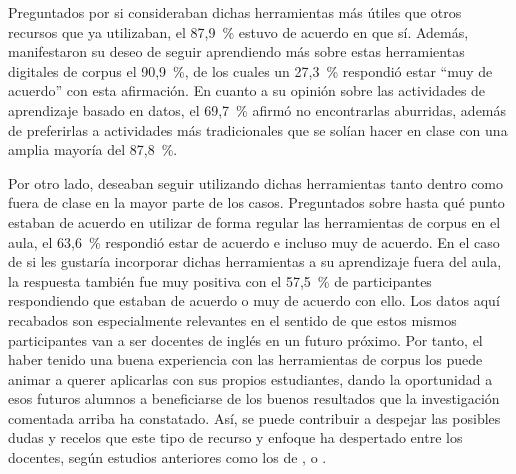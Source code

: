 Preguntados por si consideraban dichas herramientas más útiles que otros
recursos que ya utilizaban, el 87,9~\% estuvo de acuerdo en que sí.
Además, manifestaron su deseo de seguir aprendiendo más sobre estas
herramientas digitales de corpus el 90,9~\%, de los cuales un 27,3~\%
respondió estar ``muy de acuerdo'' con esta afirmación. En cuanto a su
opinión sobre las actividades de aprendizaje basado en datos, el 69,7~\%
afirmó no encontrarlas aburridas, además de preferirlas a actividades
más tradicionales que se solían hacer en clase con una amplia mayoría
del 87,8~\%.

Por otro lado, deseaban seguir utilizando dichas herramientas tanto
dentro como fuera de clase en la mayor parte de los casos. Preguntados
sobre hasta qué punto estaban de acuerdo en utilizar de forma regular
las herramientas de corpus en el aula, el 63,6~\% respondió estar de
acuerdo e incluso muy de acuerdo. En el caso de si les gustaría
incorporar dichas herramientas a su aprendizaje fuera del aula, la
respuesta también fue muy positiva con el 57,5~\% de participantes
respondiendo que estaban de acuerdo o muy de acuerdo con ello. Los datos
aquí recabados son especialmente relevantes en el sentido de que estos
mismos participantes van a ser docentes de inglés en un futuro próximo.
Por tanto, el haber tenido una buena experiencia con las herramientas de
corpus los puede animar a querer aplicarlas con sus propios estudiantes,
dando la oportunidad a esos futuros alumnos a beneficiarse de los buenos
resultados que la investigación comentada arriba ha constatado. Así, se
puede contribuir a despejar las posibles dudas y recelos que este tipo
de recurso y enfoque ha despertado entre los docentes, según estudios
anteriores como los de \textcite{boulton2017corpus}, \textcite{caliskan2018training} o
\textcite{poole2022corpus}.
